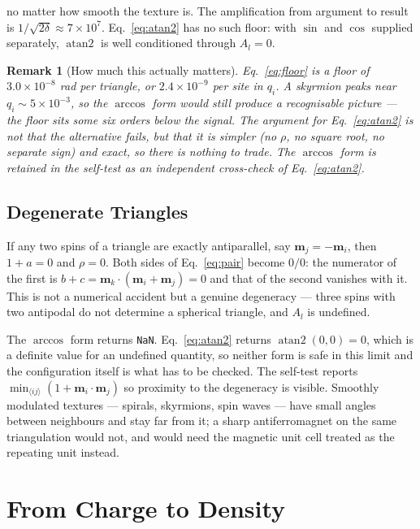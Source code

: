 \documentclass[12pt, a4paper, oneside]{article}
\newtheorem{remark}[theorem]{Remark}
\newcommand{\mvec}{\mathbf{m}}
\begin{document}
no matter how smooth the texture is. The amplification from argument to result
is $1/\sqrt{2\delta}\approx 7\times10^{7}$. Eq.~\eqref{eq:atan2} has no such
floor: with $\sin$ and $\cos$ supplied separately, $\operatorname{atan2}$ is
well conditioned through $A_l = 0$.

\begin{remark}[How much this actually matters]
Eq.~\eqref{eq:floor} is a floor of $3.0\times10^{-8}$ rad per triangle, or
$2.4\times10^{-9}$ per site in $q_i$. A skyrmion peaks near
$q_i \sim 5\times10^{-3}$, so the $\arccos$ form would still produce a
recognisable picture --- the floor sits some six orders below the signal. The
argument for Eq.~\eqref{eq:atan2} is not that the alternative fails, but that it
is simpler (no $\rho$, no square root, no separate sign) \emph{and} exact, so
there is nothing to trade. The $\arccos$ form is retained in the self-test as an
independent cross-check of Eq.~\eqref{eq:atan2}.
\end{remark}

\subsection{Degenerate Triangles}

If any two spins of a triangle are exactly antiparallel, say $\mvec_j=-\mvec_i$,
then $1+a = 0$ and $\rho = 0$. Both sides of Eq.~\eqref{eq:pair} become $0/0$:
the numerator of the first is $b + c = \mvec_k\cdot(\mvec_i+\mvec_j) = 0$ and
that of the second vanishes with it. This is not a numerical accident but a
genuine degeneracy --- three spins with two antipodal do not determine a
spherical triangle, and $A_l$ is undefined.

The $\arccos$ form returns \texttt{NaN}. Eq.~\eqref{eq:atan2} returns
$\operatorname{atan2}(0,0) = 0$, which is a definite value for an undefined
quantity, so neither form is safe in this limit and the configuration itself is
what has to be checked. The self-test reports
$\min_{\langle ij\rangle}(1 + \mvec_i\cdot\mvec_j)$ so proximity to the
degeneracy is visible. Smoothly modulated textures --- spirals, skyrmions,
spin waves --- have small angles between neighbours and stay far from it; a
sharp antiferromagnet on the same triangulation would not, and would need the
magnetic unit cell treated as the repeating unit instead.

\section{From Charge to Density}
\end{document}
